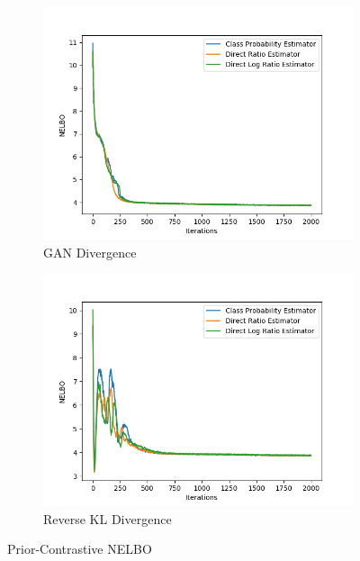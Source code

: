 \documentclass[honours,12pt]{unswthesis}
\numberwithin{equation}{section}
\theoremstyle{definition}
\begin{document}
\begin{figure}
\begin{subfigure}{0.49\textwidth}
\includegraphics[width=\linewidth]{part2nelbos/PCADVvsPCADVexpvsPCADVgudlog.png}
\caption{GAN Divergence}
\end{subfigure}
\begin{subfigure}{0.49\textwidth}
\includegraphics[width=\linewidth]{part2nelbos/PCKLDvsPCKLexpvsPCKLgudlog.png}
\caption{Reverse KL Divergence}
\end{subfigure}
\caption{Prior-Contrastive NELBO}
\end{figure}
\end{document}

